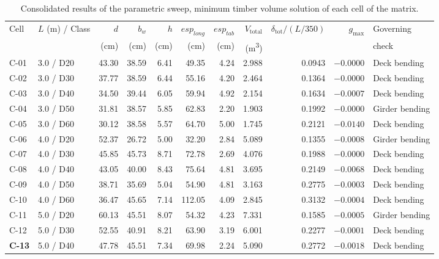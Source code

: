 \begin{table}[!ht]
\caption{Consolidated results of the parametric sweep, minimum timber volume solution of each cell of the matrix.\label{tab:resultados_matriz}}
\begin{threeparttable}
\footnotesize
\setlength{\tabcolsep}{3pt}
\begin{tabular*}{\textwidth}{@{\extracolsep{\fill}}llrrrrrrrrl@{\extracolsep{\fill}}}
\toprule
Cell & $L$ (m) / Class & $d$ & $b_w$ & $h$ & $esp_{long}$ & $esp_{tab}$ & $V_{\mathrm{total}}$ & $\delta_{\mathrm{tot}}/(L/350)$ & $g_{\max}$ & Governing \\
 & & (cm) & (cm) & (cm) & (cm) & (cm) & (m\textsuperscript{3}) & & & check \\
\midrule
C-01 & 3.0 / D20 & 43.30 & 38.59 & 6.41 & 49.35 & 4.24 & 2.988 & 0.0943 & $-0.0000$ & Deck bending \\
C-02 & 3.0 / D30 & 37.77 & 38.59 & 6.44 & 55.16 & 4.20 & 2.464 & 0.1364 & $-0.0000$ & Deck bending \\
C-03 & 3.0 / D40 & 34.50 & 39.44 & 6.05 & 59.94 & 4.92 & 2.154 & 0.1634 & $-0.0007$ & Deck bending \\
C-04 & 3.0 / D50 & 31.81 & 38.57 & 5.85 & 62.83 & 2.20 & 1.903 & 0.1992 & $-0.0000$ & Girder bending \\
C-05 & 3.0 / D60 & 30.12 & 38.58 & 5.57 & 64.70 & 5.00 & 1.745 & 0.2121 & $-0.0140$ & Deck bending \\
\midrule
C-06 & 4.0 / D20 & 52.37 & 26.72 & 5.00 & 32.20 & 2.84 & 5.089 & 0.1355 & $-0.0008$ & Girder bending \\
C-07 & 4.0 / D30 & 45.85 & 45.73 & 8.71 & 72.78 & 2.69 & 4.076 & 0.1988 & $-0.0000$ & Deck bending \\
C-08 & 4.0 / D40 & 43.05 & 40.00 & 8.43 & 75.64 & 4.81 & 3.695 & 0.2149 & $-0.0068$ & Deck bending \\
C-09 & 4.0 / D50 & 38.71 & 35.69 & 5.04 & 54.90 & 4.81 & 3.163 & 0.2775 & $-0.0003$ & Deck bending \\
C-10 & 4.0 / D60 & 36.47 & 45.65 & 7.14 & 112.05 & 4.09 & 2.845 & 0.3132 & $-0.0004$ & Deck bending \\
\midrule
C-11 & 5.0 / D20 & 60.13 & 45.51 & 8.07 & 54.32 & 4.23 & 7.331 & 0.1585 & $-0.0005$ & Girder bending \\
C-12 & 5.0 / D30 & 52.55 & 40.91 & 8.21 & 63.90 & 3.19 & 6.001 & 0.2277 & $-0.0001$ & Deck bending \\
\textbf{C-13} & 5.0 / D40 & 47.78 & 45.51 & 7.34 & 69.98 & 2.24 & 5.090 & 0.2772 & $-0.0018$ & Deck bending \\

\end{tabular*}
\end{threeparttable}
\end{table}
